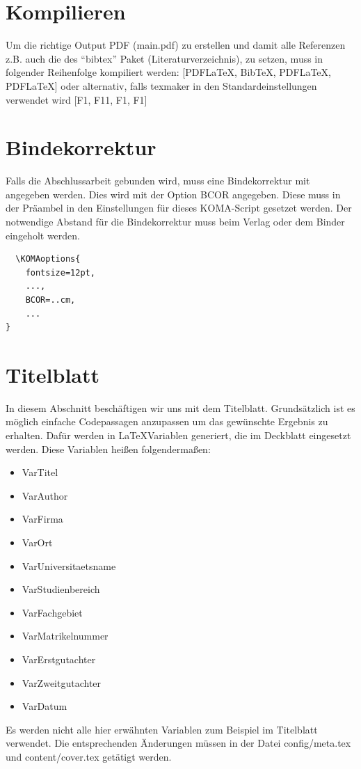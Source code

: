 	\section{Kompilieren}
		\label{sec:kompilieren}
		Um die richtige Output PDF (main.pdf) zu erstellen und damit alle Referenzen z.B. auch die des \enquote{bibtex} Paket (Literaturverzeichnis), zu setzen, muss in folgender Reihenfolge kompiliert werden: [PDFLaTeX, BibTeX, PDFLaTeX, PDFLaTeX] oder alternativ, falls texmaker in den Standardeinstellungen verwendet wird [F1, F11, F1, F1]
		
	\section{Bindekorrektur}
		\label{sec:bindekorrektur}
		Falls die Abschlussarbeit gebunden wird, muss eine Bindekorrektur mit angegeben werden. Dies wird mit der Option BCOR angegeben. Diese muss in der Präambel in den Einstellungen für dieses KOMA-Script gesetzet werden. Der notwendige Abstand für die Bindekorrektur muss beim Verlag oder dem Binder eingeholt werden.
		
\begin{lstlisting}[style=texlisting, caption={Bindekorrektur angeben}, label={lst:bindekorrektur}]
% KOMA Options
  \KOMAoptions{
    fontsize=12pt,
    ...,
    BCOR=..cm,
    ...
}
\end{lstlisting}
	
	\section{Titelblatt}
		\label{sec:titelblatt}
		In diesem Abschnitt beschäftigen wir uns mit dem Titelblatt. Grundsätzlich ist es möglich einfache Codepassagen anzupassen um das gewünschte Ergebnis zu erhalten. 
		Dafür werden in \LaTeX Variablen generiert, die im Deckblatt eingesetzt werden.
		Diese Variablen heißen folgendermaßen:
		\begin{itemize}[noitemsep]
			\item VarTitel
			\item VarAuthor
			\item VarFirma
			\item VarOrt
			\item VarUniversitaetsname
			\item VarStudienbereich
			\item VarFachgebiet
			\item VarMatrikelnummer
			\item VarErstgutachter
			\item VarZweitgutachter
			\item VarDatum
		\end{itemize}
		Es werden nicht alle hier erwähnten Variablen zum Beispiel im Titelblatt verwendet. Die entsprechenden Änderungen müssen in der Datei config/meta.tex und content/cover.tex getätigt werden.

